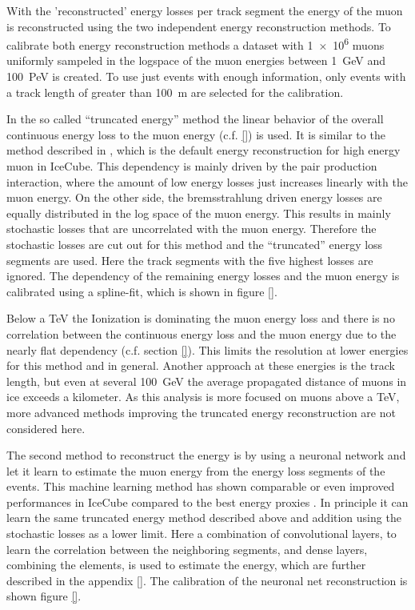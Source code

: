 With the 'reconstructed' energy losses per track segment the energy of the muon is reconstructed using the two independent energy reconstruction methods.
To calibrate both energy reconstruction methods a dataset with \num{1e6} muons uniformly sampeled in the logspace of the muon energies between \SI{1}{GeV} and \SI{100}{PeV} is created.
To use just events with enough information, only events with a track length of greater than \SI{100}{m} are selected for the calibration.

In the so called \enquote{truncated energy} method the linear behavior of the overall continuous energy loss to the muon energy (c.f. \ref{}) is used.
It is similar to the method described in \cite{ic_ereco}, which is the default energy reconstruction for high energy muon in IceCube.
This dependency is mainly driven by the pair production interaction, where the amount of low energy losses just increases linearly with the muon energy.
On the other side, the bremsstrahlung driven energy losses are equally distributed in the log space of the muon energy.
This results in mainly stochastic losses that are uncorrelated with the muon energy.
Therefore the stochastic losses are cut out for this method and the \enquote{truncated} energy loss segments are used.
Here the track segments with the five highest losses are ignored. %
The dependency of the remaining energy losses and the muon energy is calibrated using a spline-fit, which is shown in figure \ref{}.

Below a TeV the Ionization is dominating the muon energy loss and there is no correlation between the continuous energy loss and the muon energy due to the nearly flat dependency (c.f. section \ref{}).
This limits the resolution at lower energies for this method and in general.
Another approach at these energies is the track length, but even at several \SI{100}{GeV} the average propagated distance of muons in ice exceeds a kilometer.
As this analysis is more focused on muons above a TeV, more advanced methods improving the truncated energy reconstruction are not considered here.

The second method to reconstruct the energy is by using a neuronal network and let it learn to estimate the muon energy from the energy loss segments of the events.
This machine learning method has shown comparable or even improved performances in IceCube compared to the best energy proxies \cite{mirco_icrc}.
In principle it can learn the same truncated energy method described above and addition using the stochastic losses as a lower limit.
Here a combination of convolutional layers, to learn the correlation between the neighboring segments, and dense layers, combining the elements, is used to estimate the energy, which are further described in the appendix \ref{}.
The calibration of the neuronal net reconstruction is shown figure \ref{}.


